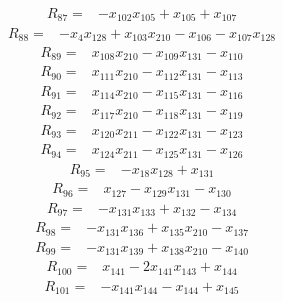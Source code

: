 \begin{align*}
R_{87}={}& -x_{102}x_{105} + x_{105} + x_{107}
\end{align*}
\begin{align*}
R_{88}={}& -x_{4}x_{128} + x_{103}x_{210} - x_{106} - x_{107}x_{128}
\end{align*}
\begin{align*}
R_{89}={}& x_{108}x_{210} - x_{109}x_{131} - x_{110}
\end{align*}
\begin{align*}
R_{90}={}& x_{111}x_{210} - x_{112}x_{131} - x_{113}
\end{align*}
\begin{align*}
R_{91}={}& x_{114}x_{210} - x_{115}x_{131} - x_{116}
\end{align*}
\begin{align*}
R_{92}={}& x_{117}x_{210} - x_{118}x_{131} - x_{119}
\end{align*}
\begin{align*}
R_{93}={}& x_{120}x_{211} - x_{122}x_{131} - x_{123}
\end{align*}
\begin{align*}
R_{94}={}& x_{124}x_{211} - x_{125}x_{131} - x_{126}
\end{align*}
\begin{align*}
R_{95}={}& -x_{18}x_{128} + x_{131}
\end{align*}
\begin{align*}
R_{96}={}& x_{127} - x_{129}x_{131} - x_{130}
\end{align*}
\begin{align*}
R_{97}={}& -x_{131}x_{133} + x_{132} - x_{134}
\end{align*}
\begin{align*}
R_{98}={}& -x_{131}x_{136} + x_{135}x_{210} - x_{137}
\end{align*}
\begin{align*}
R_{99}={}& -x_{131}x_{139} + x_{138}x_{210} - x_{140}
\end{align*}
\begin{align*}
R_{100}={}& x_{141} - 2x_{141}x_{143} + x_{144}
\end{align*}
\begin{align*}
R_{101}={}& -x_{141}x_{144} - x_{144} + x_{145}
\end{align*}
